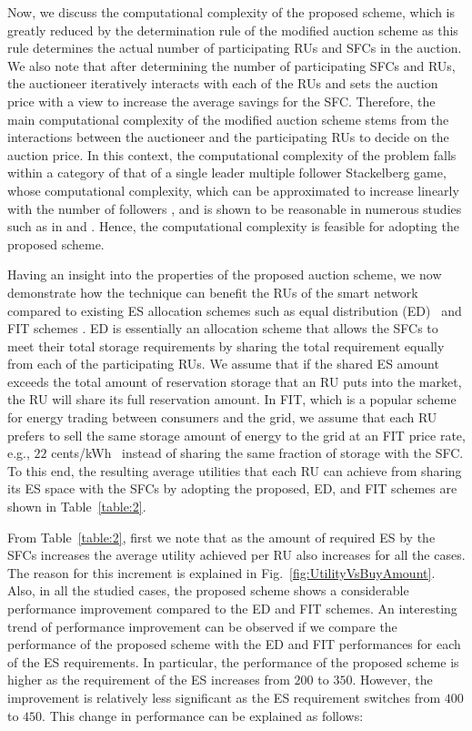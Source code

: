 \documentclass[journal,10pt]{IEEEtran}
\begin{document}
Now, we discuss the computational complexity of the proposed scheme, which is greatly reduced by the determination rule of the modified auction scheme as this rule determines the actual number of participating RUs and SFCs in the auction. We also note that after determining the number of participating SFCs and RUs, the auctioneer iteratively interacts with each of the RUs and sets the auction price with a view to increase the average savings for the SFC. Therefore, the main computational complexity of the modified auction scheme stems from the interactions between the auctioneer and the participating RUs to decide on the auction price. In this context, the computational complexity of the problem falls within a category of that of a single leader multiple follower Stackelberg game, whose computational complexity, which can be approximated to increase linearly with the number of followers \cite{Wayes-J-TSG:2012}, and is shown to be reasonable in numerous studies such as in \cite{Tushar-TIE:2014} and \cite{Wayes-J-TSG:2012}. Hence, the computational complexity is feasible for adopting the proposed scheme.

Having an insight into the properties of the proposed auction scheme, we now demonstrate how the technique can benefit the RUs of the smart network compared to existing ES allocation schemes such as equal distribution (ED)~\cite{Wayes-J-TSG:2012} and FIT schemes \cite{Goran:2011}. ED is essentially an allocation scheme that allows the SFCs to meet their total storage requirements by sharing the total requirement equally from each of the participating RUs. We assume that if the shared ES amount exceeds the total amount of reservation storage that an RU puts into the market, the RU will share its full reservation amount. In FIT, which is a popular scheme for energy trading between consumers and the grid, we assume that each RU prefers to sell the same storage amount of energy to the grid at an FIT price rate, e.g., $22$ cents/kWh~\cite{LIPA} instead of sharing the same fraction of storage with the SFC. To this end, the resulting average utilities that each RU can achieve from sharing its ES space with the SFCs by adopting the proposed, ED, and FIT schemes are shown in Table~\ref{table:2}.

From Table~\ref{table:2}, first we note that as the amount of required ES by the SFCs increases the average utility achieved per RU also increases for all the cases. The reason for this increment is explained in Fig.~\ref{fig:UtilityVsBuyAmount}. Also, in all the studied cases, the proposed scheme shows a considerable performance improvement compared to the ED  and FIT schemes. An interesting trend of performance improvement can be observed if we compare the performance of the proposed scheme with the ED and FIT performances for each of the ES requirements. In particular, the performance of the proposed scheme is higher as the requirement of the ES increases from $200$ to $350$. However, the improvement is relatively less significant as the ES requirement switches from $400$ to $450$. This change in performance can be explained as follows:
\end{document}
